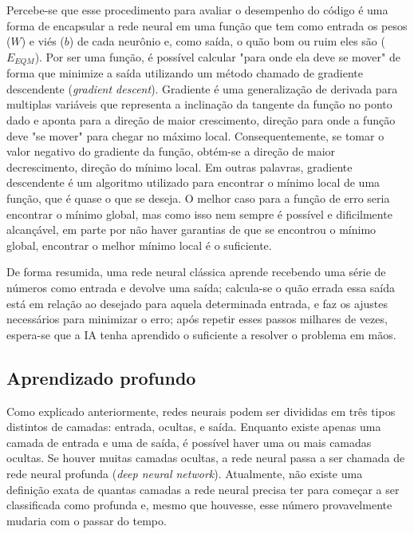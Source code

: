 Percebe-se que esse procedimento para avaliar o desempenho do código é uma forma de encapsular a rede neural em uma função que tem como entrada os pesos ($W$) e viés ($b$) de cada neurônio e, como saída, o quão bom ou ruim eles são ($E_{EQM}$). Por ser uma função, é possível calcular "para onde ela deve se mover"{} de forma que minimize a saída utilizando um método chamado de gradiente descendente (\textit{gradient descent}).
Gradiente é uma generalização de derivada para multiplas variáveis que representa a inclinação da tangente da função no ponto dado e aponta para a direção de maior crescimento, direção para onde a função deve "se mover"{} para chegar no máximo local. Consequentemente, se tomar o valor negativo do gradiente da função, obtém-se a direção de maior decrescimento, direção do mínimo local.
Em outras palavras, gradiente descendente é um algoritmo utilizado para encontrar o mínimo local de uma função, que é quase o que se deseja. O melhor caso para a função de erro seria encontrar o mínimo global, mas como isso nem sempre é possível e dificilmente alcançável, em parte por não haver garantias de que se encontrou o mínimo global, encontrar o melhor mínimo local é o suficiente.

De forma resumida, uma rede neural clássica aprende recebendo uma série de números como entrada e devolve uma saída; calcula-se o quão errada essa saída está em relação ao desejado para aquela determinada entrada, e faz os ajustes necessários para minimizar o erro; após repetir esses passos milhares de vezes, espera-se que a IA tenha aprendido o suficiente a resolver o problema em mãos.

\subsection{Aprendizado profundo}
\label{sec:dl}

Como explicado anteriormente, redes neurais podem ser divididas em três tipos distintos de camadas: entrada, ocultas, e saída. Enquanto existe apenas uma camada de entrada e uma de saída, é possível haver uma ou mais camadas ocultas. Se houver muitas camadas ocultas, a rede neural passa a ser chamada de rede neural profunda (\textit{deep neural network}). Atualmente, não existe uma definição exata de quantas camadas a rede neural precisa ter para começar a ser classificada como profunda e, mesmo que houvesse, esse número provavelmente mudaria com o passar do tempo.

